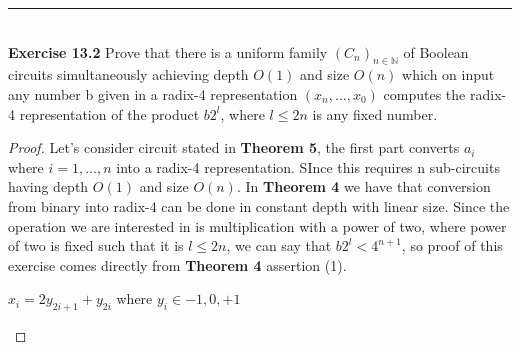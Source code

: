 \documentclass[a4paper]{article}
\begin{document}
\noindent\rule{12cm}{0.4pt}\\
\noindent \textbf{Exercise 13.2} Prove that there is a uniform family $\left(C_{n}\right)_{n \in \mathbb{N}}$ of Boolean circuits simultaneously achieving depth $O(1)$ and size $O(n)$ which on input any number b given in a radix-4 representation $(x_{n},  \ldots , x_{0})$ computes the radix-4 representation of the product $b2^{l}$, where $l \leq 2n$ is any fixed number.
\begin{proof}
Let's consider circuit stated in \textbf{Theorem 5}, the first part converts $a_{i}$ where $i = 1, \ldots, n$ into a radix-4 representation. SInce this requires n sub-circuits having depth $O(1)$ and size $O(n)$. In \textbf{Theorem 4} we have that conversion from binary into radix-4 can be done in constant depth with linear size. Since the operation we are interested in is multiplication with a power of two, where power of two is fixed such that it is $l \leq 2n$, we can say that $b2^{l} < 4^{n+1}$, so proof of this exercise comes directly from \textbf{Theorem 4} assertion (1).
\begin{center}
$x_{i} = 2y_{2i+1}+y_{2i}$ where $y_{i} \in {-1, 0, +1}$
\end{center}
\end{proof}
\end{document}
